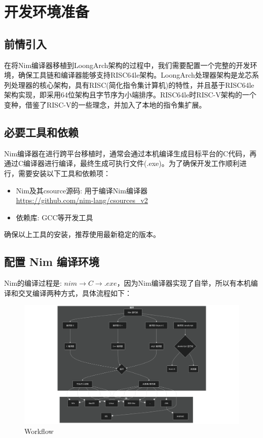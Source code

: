 \documentclass[UTF8]{ctexart}
\begin{document}
\section{开发环境准备} %
	\subsection{前情引入} %
	在将Nim编译器移植到LoongArch架构的过程中，我们需要配置一个完整的开发环境，确保工具链和编译器能够支持RISC64le架构。LoongArch处理器架构是龙芯系列处理器的核心架构，具有RISC(简化指令集计算机)的特性，并且基于RISC64le架构实现，即采用64位架构且字节序为小端排序。RISC64le时RISC-V架构的一个变种，借鉴了RISC-V的一些理念，并加入了本地的指令集扩展。
	\subsection{必要工具和依赖} %
	Nim编译器在进行跨平台移植时，通常会通过本机编译生成目标平台的C代码，再通过C编译器进行编译，最终生成可执行文件(.exe)。为了确保开发工作顺利进行，需要安装以下工具和依赖项：
	\begin{itemize}[leftmargin=3.5em]
		\item Nim及其csource源码: 用于编译Nim编译器 \\
				{\underline{\url{https://github.com/nim-lang/csources_v2}}} 
		\item 依赖库: GCC等开发工具
	\end{itemize}
	\hspace*{2em}确保以上工具的安装，推荐使用最新稳定的版本。
	\subsection{配置 Nim 编译环境} %
	Nim的编译过程是: $nim \rightarrow C \rightarrow .exe$，因为Nim编译器实现了自举，所以有本机编译和交叉编译两种方式，具体流程如下：
	\begin{figure}[htbp]
		\centering
		\includegraphics[width=\linewidth]{workflow_2.png}
		\caption{Workflow}
		\label{fig:workflow}
	\end{figure}
\end{document}
